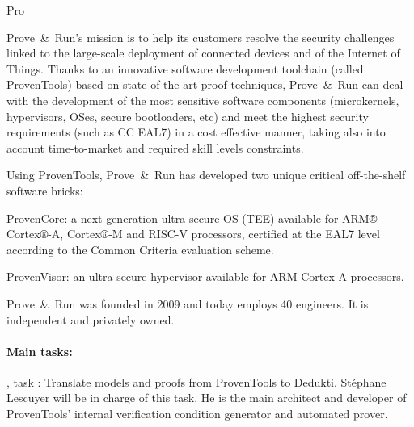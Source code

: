 \begin{sitedescription}{Pro}

\newcommand{\provenrun}[0]{Prove\ \&\ Run}


\provenrun's mission is to help its customers resolve the security
challenges linked to the large-scale deployment of connected devices
and of the Internet of Things. Thanks to an innovative software
development toolchain (called ProvenTools) based on state of the art
proof techniques, \provenrun{} can deal with the development of the
most sensitive software components (microkernels, hypervisors, OSes,
secure bootloaders, etc) and meet the highest security requirements
(such as CC EAL7) in a cost effective manner, taking also into account
time-to-market and required skill levels constraints.

Using ProvenTools, \provenrun{} has developed two unique critical
off-the-shelf software bricks:
\begin{compactitem}
\item ProvenCore: a next generation ultra-secure OS (TEE) available
  for ARM® Cortex®-A, Cortex®-M and RISC-V processors, certified at
  the EAL7 level according to the Common Criteria evaluation scheme.
\item ProvenVisor: an ultra-secure hypervisor available for ARM
  Cortex-A processors.
\end{compactitem}

\provenrun{} was founded in 2009 and today employs 40 engineers. It is
independent and privately owned.

\paragraph*{Main tasks:}

\begin{compactitem}
\item {}, task : Translate
  models and proofs from ProvenTools to Dedukti.  Stéphane Lescuyer
  will be in charge of this task. He is the main architect and
  developer of ProvenTools' internal verification condition generator
  and automated prover.
\end{compactitem}


\end{sitedescription}
